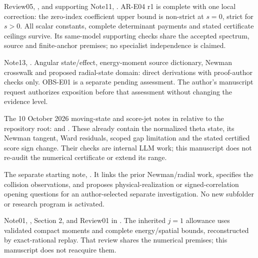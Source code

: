 \documentclass[11pt,letterpaper]{article}
\numberwithin{equation}{section}
\theoremstyle{remark}
\newcommand{\evid}[1]{\textsf{[#1]}}
\begin{document}
\begin{description}[style=nextline,leftmargin=1.4cm]
\item[\evid{AR4}] Review05,
,
and supporting Note11,
.
AR-E04 r1 is complete with one local correction: the zero-index
coefficient upper bound is non-strict at \(s=0\), strict for \(s>0\).
All scalar constants, complete determinant payments and stated certificate
ceilings survive. Its same-model supporting checks share the accepted
spectrum, source and finite-anchor premises; no specialist independence
is claimed.

\item[\evid{O}] Note13,
.
Angular state/effect, energy-moment source dictionary, Newman crosswalk
and proposed radial-state domain: direct derivations with proof-author
checks only. OBS-E01 is a separate pending assessment. The author's
manuscript request authorizes exposition before that assessment without
changing the evidence level.

\item[\evid{N}] The 10 October 2026 moving-state and score-jet notes in
relative to the repository root:
and
.
These already contain the normalized theta state, its Newman tangent,
Ward residuals, scoped gap limitation and the stated certified score
sign change. Their checks are internal LLM work; this manuscript does
not re-audit the numerical certificate or extend its range.

\item[\evid{NB}] The separate starting note,
.
It links the prior Newman/radial work, specifies the collision
observations, and proposes physical-realization or signed-correlation
opening questions for an author-selected separate investigation.
No new subfolder or research program is activated.

\item[\evid{E1}] Note01,
,
Section 2, and Review01 in .
The inherited \(j=1\) allowance uses validated compact moments
and complete energy/spatial bounds, reconstructed by exact-rational
replay. That review shares the numerical premises; this manuscript
does not reacquire them.


\end{description}
\end{document}
